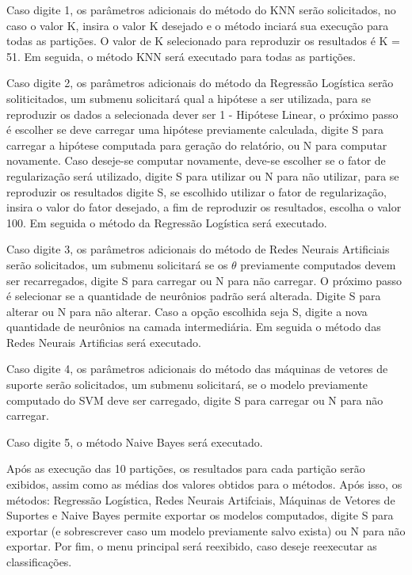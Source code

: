 Caso digite 1, os parâmetros adicionais do método do KNN serão solicitados, no caso o valor K, insira o valor K desejado e o método inciará sua execução para todas as partições. O valor de K selecionado para reproduzir os resultados é K = 51. Em seguida, o método KNN será executado para todas as partições.

Caso digite 2, os parâmetros adicionais do método da Regressão Logística serão soliticitados, um submenu solicitará qual a hipótese a ser utilizada, para se reproduzir os dados a selecionada dever ser 1 - Hipótese Linear, o próximo passo é escolher se deve carregar uma hipótese previamente calculada, digite S para carregar a hipótese computada para geração do relatório, ou N para computar novamente. Caso deseje-se computar novamente, deve-se escolher se o fator de regularização será utilizado, digite S para utilizar ou N para não utilizar, para se reproduzir os resultados digite S, se escolhido utilizar o fator de regularização, insira o valor do fator desejado, a fim de reproduzir os resultados, escolha o valor 100. Em seguida o método da Regressão Logística será executado.

Caso digite 3, os parâmetros adicionais do método de Redes Neurais Artificiais serão solicitados, um submenu solicitará se os \(\theta\) previamente computados devem ser recarregados, digite S para carregar ou N para não carregar. O próximo passo é selecionar se a quantidade de neurônios padrão será alterada. Digite S para alterar ou N para não alterar. Caso a opção escolhida seja S, digite a nova quantidade de neurônios na camada intermediária.
Em seguida o método das Redes Neurais Artificias será executado.

Caso digite 4, os parâmetros adicionais do método das máquinas de vetores de suporte serão solicitados, um submenu solicitará, se o modelo previamente computado do SVM deve ser carregado, digite S para carregar ou N para não carregar.

Caso digite 5, o método Naive Bayes será executado.

Após as execução das 10 partições, os resultados para cada partição serão exibidos, assim como as médias dos valores obtidos para o métodos. Após isso, os métodos: Regressão Logística, Redes Neurais Artifciais, Máquinas de Vetores de Suportes e Naive Bayes permite exportar os modelos computados, digite S para exportar (e sobrescrever caso um modelo previamente salvo exista) ou N para não exportar. Por fim, o menu principal será reexibido, caso deseje reexecutar as classificações.


